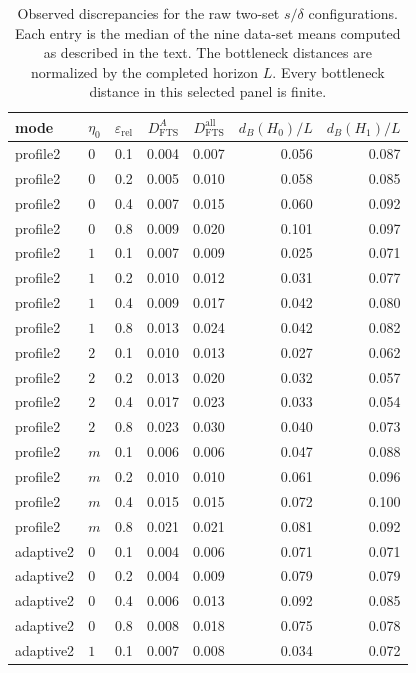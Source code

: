 \documentclass[a4paper,11pt]{article}
\theoremstyle{definition}
\theoremstyle{remark}
\begin{document}
\begin{table}[!ht]
\centering
\scriptsize
\caption{Observed discrepancies for the raw two-set $s/\delta$ configurations. Each entry is the median of the nine data-set means computed as described in the text. The bottleneck distances are normalized by the completed horizon $L$. Every bottleneck distance in this selected panel is finite.}
\label{tab:stability-absolute}
\begin{tabular}{llcrrrr}
\toprule
mode & $\eta_0$ & $\varepsilon_{\mathrm{rel}}$ & $D_{\mathrm{FTS}}^A$ & $D_{\mathrm{FTS}}^{\mathrm{all}}$ & $d_B(H_0)/L$ & $d_B(H_1)/L$ \\
\midrule
profile2 & $0$ & 0.1 & 0.004 & 0.007 & 0.056 & 0.087 \\
profile2 & $0$ & 0.2 & 0.005 & 0.010 & 0.058 & 0.085 \\
profile2 & $0$ & 0.4 & 0.007 & 0.015 & 0.060 & 0.092 \\
profile2 & $0$ & 0.8 & 0.009 & 0.020 & 0.101 & 0.097 \\
profile2 & $1$ & 0.1 & 0.007 & 0.009 & 0.025 & 0.071 \\
profile2 & $1$ & 0.2 & 0.010 & 0.012 & 0.031 & 0.077 \\
profile2 & $1$ & 0.4 & 0.009 & 0.017 & 0.042 & 0.080 \\
profile2 & $1$ & 0.8 & 0.013 & 0.024 & 0.042 & 0.082 \\
profile2 & $2$ & 0.1 & 0.010 & 0.013 & 0.027 & 0.062 \\
profile2 & $2$ & 0.2 & 0.013 & 0.020 & 0.032 & 0.057 \\
profile2 & $2$ & 0.4 & 0.017 & 0.023 & 0.033 & 0.054 \\
profile2 & $2$ & 0.8 & 0.023 & 0.030 & 0.040 & 0.073 \\
profile2 & $m$ & 0.1 & 0.006 & 0.006 & 0.047 & 0.088 \\
profile2 & $m$ & 0.2 & 0.010 & 0.010 & 0.061 & 0.096 \\
profile2 & $m$ & 0.4 & 0.015 & 0.015 & 0.072 & 0.100 \\
profile2 & $m$ & 0.8 & 0.021 & 0.021 & 0.081 & 0.092 \\
adaptive2 & $0$ & 0.1 & 0.004 & 0.006 & 0.071 & 0.071 \\
adaptive2 & $0$ & 0.2 & 0.004 & 0.009 & 0.079 & 0.079 \\
adaptive2 & $0$ & 0.4 & 0.006 & 0.013 & 0.092 & 0.085 \\
adaptive2 & $0$ & 0.8 & 0.008 & 0.018 & 0.075 & 0.078 \\
adaptive2 & $1$ & 0.1 & 0.007 & 0.008 & 0.034 & 0.072 \\

\end{tabular}
\end{table}
\end{document}
